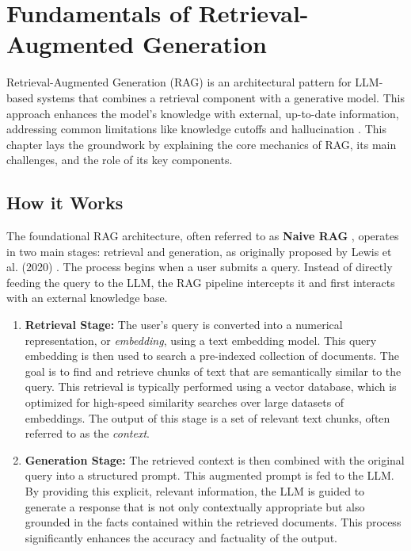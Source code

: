 \chapter{Fundamentals of Retrieval-Augmented Generation}
\label{chap:fundamentals_rag}

Retrieval-Augmented Generation (RAG) is an architectural pattern for LLM-based systems that combines a retrieval component with a generative model. This approach enhances the model's knowledge with external, up-to-date information, addressing common limitations like knowledge cutoffs and hallucination \autocite{lewis2020retrieval, gao2024retrievalaugmented}. This chapter lays the groundwork by explaining the core mechanics of RAG, its main challenges, and the role of its key components.

\section{How it Works}
The foundational RAG architecture, often referred to as \textbf{Naive RAG} \autocite{gao2024retrievalaugmented}, operates in two main stages: retrieval and generation, as originally proposed by Lewis et al. (2020) \autocite{lewis2020retrieval}. The process begins when a user submits a query. Instead of directly feeding the query to the LLM, the RAG pipeline intercepts it and first interacts with an external knowledge base.

\begin{enumerate}
    \item \textbf{Retrieval Stage:} The user's query is converted into a numerical representation, or \textit{embedding}, using a text embedding model. This query embedding is then used to search a pre-indexed collection of documents. The goal is to find and retrieve chunks of text that are semantically similar to the query. This retrieval is typically performed using a vector database, which is optimized for high-speed similarity searches over large datasets of embeddings. The output of this stage is a set of relevant text chunks, often referred to as the \textit{context}.
    
    \item \textbf{Generation Stage:} The retrieved context is then combined with the original query into a structured prompt. This augmented prompt is fed to the LLM. By providing this explicit, relevant information, the LLM is guided to generate a response that is not only contextually appropriate but also grounded in the facts contained within the retrieved documents. This process significantly enhances the accuracy and factuality of the output.
\end{enumerate}

